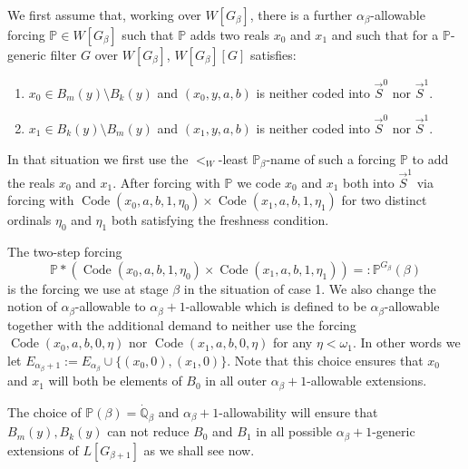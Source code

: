 \documentclass[a4paper,11pt]{article}
\newcommand{\forceP}{\mathbb{P}}
\newcommand{\forceQ}{\mathbb{Q}}
\begin{document}
We first assume that, working over $W[G_{\beta}]$, there is a further $\alpha_{\beta}$-allowable forcing $\forceP \in W[G_{\beta}]$ such that $\forceP$ adds two reals $x_0$ and $x_1$ and such that for a $\forceP$-generic filter $G$ over $W[G_{\beta}]$, $W[G_{\beta}] [G]$ satisfies:
\begin{enumerate}

\item $x_0 \in B_m(y) \setminus B_k(y)$ and $(x_0,y,a,b)$ is neither coded into $\vec{S}^0$ nor $\vec{S}^1$.
\item $x_1 \in B_k(y) \setminus B_m(y)$ and $(x_1,y,a,b)$ is neither coded into $\vec{S}^0$ nor $\vec{S}^1$.
\end{enumerate}

In that situation we first use the $<_W$-least $\forceP_{\beta}$-name of such a forcing $\forceP$ to add the reals $x_0$ and $x_1$.
After forcing with $\forceP$ we code $x_0$ and $x_1$ both into $\vec{S}^1$  via forcing with $\operatorname{Code} (x_0,a,b,1,\eta_0) \times \operatorname{Code} (x_1,a,b,1,\eta_1)$ for two distinct ordinals $\eta_0$ and $\eta_1$ both satisfying the freshness condition.
 
 
The two-step forcing \[\forceP \ast (\operatorname{Code} (x_0,a,b,1,\eta_0) \times \operatorname{Code} (x_1,a,b,1,\eta_1))= : \forceP^{G_{\beta}}(\beta)\] is the forcing we use at stage $\beta$ in the situation of case 1. We also change the notion of $\alpha_{\beta}$-allowable to $\alpha_{\beta}+1$-allowable which is defined to be $\alpha_{\beta}$-allowable together with the additional demand to neither use the forcing $\operatorname{Code} (x_0,a,b,0,\eta)$ nor $\operatorname{Code} (x_1,a,b,0,\eta)$ for any $\eta < \omega_1$. In other words we let $E_{\alpha_{\beta}+1}:= E_{\alpha_{\beta}} \cup  \{ (x_0,0) ,(x_1,0) \}$. Note that this choice ensures that $x_0$ and $x_1$ will both be elements of $B_0$ in all outer $\alpha_{\beta} +1$-allowable extensions.

The choice of $\forceP(\beta) =\dot{\forceQ}_{\beta}$ and $\alpha_{\beta} +1$-allowability will ensure that $B_m(y), B_k(y)$ can not reduce $B_0$ and $B_1$ in all possible $\alpha_{\beta}+1$-generic extensions of $L[G_{\beta+1}]$ as we shall see now.
\end{document}
